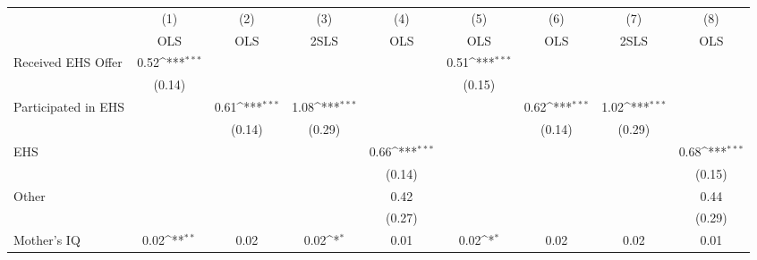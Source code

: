 {
\def\sym#1{\ifmmode^{#1}\else\(^{#1}\)\fi}
\begin{tabular}{l*{8}{c}}
\hline\hline
                    &\multicolumn{1}{c}{(1)}&\multicolumn{1}{c}{(2)}&\multicolumn{1}{c}{(3)}&\multicolumn{1}{c}{(4)}&\multicolumn{1}{c}{(5)}&\multicolumn{1}{c}{(6)}&\multicolumn{1}{c}{(7)}&\multicolumn{1}{c}{(8)}\\
                    &\multicolumn{1}{c}{OLS}&\multicolumn{1}{c}{OLS}&\multicolumn{1}{c}{2SLS}&\multicolumn{1}{c}{OLS}&\multicolumn{1}{c}{OLS}&\multicolumn{1}{c}{OLS}&\multicolumn{1}{c}{2SLS}&\multicolumn{1}{c}{OLS}\\
\hline
Received EHS Offer  &        0.52\sym{***}&                     &                     &                     &        0.51\sym{***}&                     &                     &                     \\
                    &      (0.14)         &                     &                     &                     &      (0.15)         &                     &                     &                     \\
[1em]
Participated in EHS &                     &        0.61\sym{***}&        1.08\sym{***}&                     &                     &        0.62\sym{***}&        1.02\sym{***}&                     \\
                    &                     &      (0.14)         &      (0.29)         &                     &                     &      (0.14)         &      (0.29)         &                     \\
[1em]
EHS                 &                     &                     &                     &        0.66\sym{***}&                     &                     &                     &        0.68\sym{***}\\
                    &                     &                     &                     &      (0.14)         &                     &                     &                     &      (0.15)         \\
[1em]
Other               &                     &                     &                     &        0.42         &                     &                     &                     &        0.44         \\
                    &                     &                     &                     &      (0.27)         &                     &                     &                     &      (0.29)         \\
[1em]
Mother's IQ         &        0.02\sym{**} &        0.02         &        0.02\sym{*}  &        0.01         &        0.02\sym{*}  &        0.02         &        0.02         &        0.01         \\

\end{tabular}}
